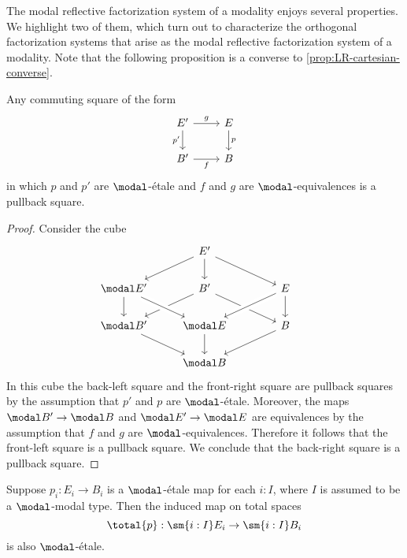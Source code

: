 \documentclass{msc}
\begin{document}
The modal reflective factorization system of a modality enjoys several properties. We highlight two of them, which turn out to characterize the orthogonal factorization systems that arise as the modal reflective factorization system of a modality. Note that the following proposition is a converse to \cref{prop:LR-cartesian-converse}.

\begin{prp}\label{prop:LR-cartesian}
  Any commuting square of the form
  \begin{equation*}
    \begin{tikzcd}
      E' \arrow[d,swap,"{p'}"] \arrow[r,"g"] & E \arrow[d,"p"] \\
      B' \arrow[r,swap,"f"] & B
    \end{tikzcd}
  \end{equation*}
  in which $p$ and $p'$ are $\modal$-\'etale and $f$ and $g$ are $\modal$-equivalences is a pullback square.
\end{prp}

\begin{proof}
  Consider the cube
  \begin{equation*}
    \begin{tikzcd}
      & E' \arrow[dl] \arrow[d] \arrow[dr] & \phantom{\modal E'} \\
      \modal E' \arrow[d] & B' \arrow[dl] \arrow[dr] & E \arrow[d] \arrow[dl,crossing over] \\
      \modal B' \arrow[dr] & \modal E \arrow[from=ul,crossing over] \arrow[d] & B \arrow[dl] \\
      & \modal B & \phantom{\modal B'}
    \end{tikzcd}
  \end{equation*}
  In this cube the back-left square and the front-right square are pullback squares by the assumption that $p'$ and $p$ are $\modal$-\'etale. Moreover, the maps $\modal B'\to\modal B$ and $\modal E'\to\modal E$ are equivalences by the assumption that $f$ and $g$ are $\modal$-equivalences. Therefore it follows that the front-left square is a pullback square. We conclude that the back-right square is a pullback square.
\end{proof}

\begin{prp}\label{prop:R-stable}
  Suppose $p_i:E_i\to B_i$ is a $\modal$-\'etale map for each $i:I$, where $I$ is assumed to be a $\modal$-modal type. Then the induced map on total spaces
  \begin{equation*}
    \total{p} : \sm{i:I}E_i\to \sm{i:I}B_i
  \end{equation*}
  is also $\modal$-\'etale.
\end{prp}
\end{document}
